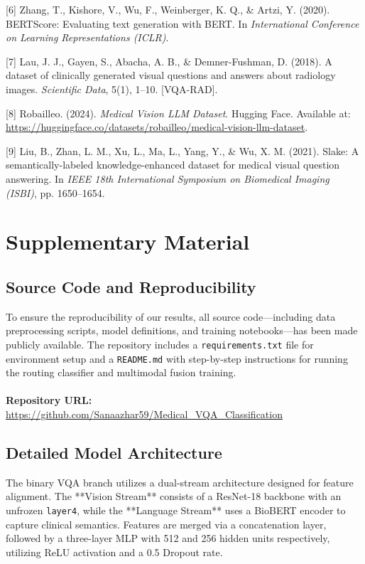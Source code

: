 \documentclass{article}
\begin{document}
{{{[6] Zhang, T., Kishore, V., Wu, F., Weinberger, K. Q., \& Artzi, Y. (2020). BERTScore: Evaluating text generation with BERT. In \textit{International Conference on Learning Representations (ICLR)}.

[7] Lau, J. J., Gayen, S., Abacha, A. B., \& Demner-Fushman, D. (2018). A dataset of clinically generated visual questions and answers about radiology images. \textit{Scientific Data}, 5(1), 1--10. [VQA-RAD].

[8] Robailleo. (2024). \textit{Medical Vision LLM Dataset}. Hugging Face. Available at: \url{https://huggingface.co/datasets/robailleo/medical-vision-llm-dataset}.

[9] Liu, B., Zhan, L. M., Xu, L., Ma, L., Yang, Y., \& Wu, X. M. (2021). Slake: A semantically-labeled knowledge-enhanced dataset for medical visual question answering. In \textit{IEEE 18th International Symposium on Biomedical Imaging (ISBI)}, pp. 1650--1654.
}


}


\appendix
\section{Supplementary Material}

\subsection{Source Code and Reproducibility}
To ensure the reproducibility of our results, all source code—including data preprocessing scripts, model definitions, and training notebooks—has been made publicly available. The repository includes a \texttt{requirements.txt} file for environment setup and a \texttt{README.md} with step-by-step instructions for running the routing classifier and multimodal fusion training.
\\ \\
\textbf{Repository URL:} \url{https://github.com/Sanaazhar59/Medical_VQA_Classification}

\subsection{Detailed Model Architecture}
The binary VQA branch utilizes a dual-stream architecture designed for feature alignment. The **Vision Stream** consists of a ResNet-18 backbone with an unfrozen \texttt{layer4}, while the **Language Stream** uses a BioBERT encoder to capture clinical semantics. Features are merged via a concatenation layer, followed by a three-layer MLP with 512 and 256 hidden units respectively, utilizing ReLU activation and a 0.5 Dropout rate.



}
\end{document}
